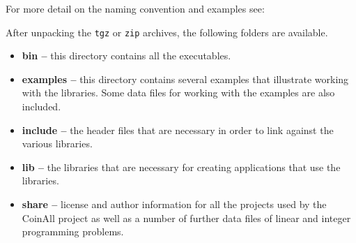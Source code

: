 For more detail on the naming convention and examples see:

\medskip
\noindent{\tt\UrlCoinNames}
\medskip

After unpacking the {\tt tgz} or {\tt zip} archives, the following folders are available.
\begin{itemize}

\item[] {\bf bin --} this directory contains all the executables.

\item[] {\bf examples --} this directory contains several examples that illustrate working with 
the libraries. Some data files for working with the examples are also included.

\item[]  {\bf include --} the header files that are necessary in order to link against the various libraries.

\item[] {\bf lib --} the libraries that are necessary for creating applications that use the  libraries.


\item[] {\bf  share --} license and author information for all the projects used by the CoinAll project as well as a number of further data files of linear and integer programming problems.

\end{itemize}




